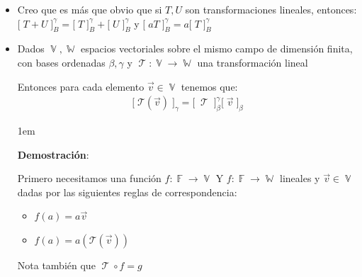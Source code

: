 \documentclass[12pt, fleqn]{report}                             %
\newenvironment{SmallIndentation}[1][0.75em]                    %
        {\begin{adjustwidth}{#1}{}\begin{footnotesize}}             %
        {\end{footnotesize}\end{adjustwidth}}                       %
\theoremstyle{break}                                            %
\DeclareMathOperator \GenericField {\mathbb{F}}                 %
\DeclareMathOperator \VectorSet    {\mathbb{V}}                 %
\DeclareMathOperator \SubVectorSet {\mathbb{W}}                 %
\DeclareMathOperator \LinTrans {\mathcal{T}}                    %
\newcommand{\bigBrackets}[1] {\big[ \; #1 \; \big]}             %
\newcommand{\Wrap}[1]    {\left( #1 \right)}                    %
\newcommand{\FnLinTrans}[1]{\mathcal{T}\Wrap{#1}}               %
\begin{document}
                \begin{itemize}
                    
                    \item 
                        Creo que es más que obvio que si $T, U$ son transformaciones
                        lineales, entonces:
                        $\bigBrackets{T + U}_B^\gamma = \bigBrackets{T}_B^\gamma + \bigBrackets{U}_B^\gamma$
                        y $\bigBrackets{aT}_B^\gamma = a\bigBrackets{T}_B^\gamma$

                    \item
                        Dados $\VectorSet, \SubVectorSet$ espacios vectoriales sobre el mismo campo
                        de dimensión finita, con bases ordenadas
                        $\beta, \gamma$ y $\LinTrans: \VectorSet \to \SubVectorSet$ una transformación lineal

                        Entonces para cada elemento $\vec v \in \VectorSet$
                        tenemos que:
                        \begin{align*}
                            \bigBrackets{\FnLinTrans{\vec v}}_\gamma =
                                \bigBrackets{\LinTrans}_\beta^\gamma 
                                \bigBrackets{\vec v}_\beta 
                        \end{align*}

                        \begin{SmallIndentation}[1em]
                            \textbf{Demostración}:
                            
                            Primero necesitamos una función $f: \GenericField \to \VectorSet$
                            Y $f: \GenericField \to \SubVectorSet$ lineales y $\vec v \in \VectorSet$
                            dadas por las siguientes reglas de correspondencia:
                            \begin{itemize}
                                \item $f(a) = a \vec v$
                                \item $f(a) = a (\FnLinTrans{\vec v})$
                            \end{itemize}

                            Nota también que $\LinTrans \circ f = g$


\end{SmallIndentation}
\end{itemize}
\end{document}
